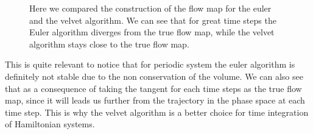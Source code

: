 \documentclass[ansiapaper]{report}
\begin{document}
\begin{multicols}{3}
\begin{figure}[H]
		\caption{\label{fig:Velevet_Construction} Here we compared the construction of the flow map for the euler and the velvet algorithm. We can see that for great time steps the Euler algorithm diverges from the true flow map, while the velvet algorithm stays close to the true flow map.}
	\end{figure}
	This is quite relevant to notice that for periodic system the euler algorithm is definitely not stable due to the non conservation of the volume. We can also see that as a consequence of taking the tangent for each time steps as the true flow map, since it will leads us further from the trajectory in the phase space at each time step. This is why the velvet algorithm is a better choice for time integration of Hamiltonian systems.

    	\begin{figure}[H]
		\centering

\end{figure}
\end{multicols}
\end{document}
